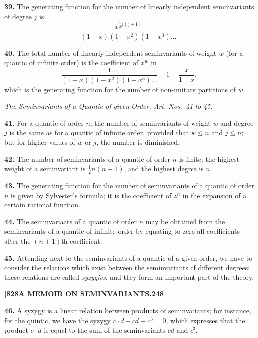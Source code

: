 \documentclass[11pt,a4paper]{book}
\begin{document}
\noindent\textbf{39.} The generating function for the number of linearly independent seminvariants of degree $j$ is
\[
\frac{x^{\frac{1}{2}j(j+1)}}{(1-x)(1-x^2)(1-x^3)\dots}.
\]

\noindent\textbf{40.} The total number of linearly independent seminvariants of weight $w$ (for a quantic of infinite order) is the coefficient of $x^w$ in
\[
\frac{1}{(1-x)(1-x^2)(1-x^3)\dots} - 1 - \frac{x}{1-x},
\]
which is the generating function for the number of non-unitary partitions of $w$.

\begin{center}
\textit{The Seminvariants of a Quantic of given Order. Art. Nos.~41 to 45.}
\end{center}

\noindent\textbf{41.} For a quantic of order $n$, the number of seminvariants of weight $w$ and degree $j$ is the same as for a quantic of infinite order, provided that $w \leq n$ and $j \leq n$; but for higher values of $w$ or $j$, the number is diminished.

\noindent\textbf{42.} The number of seminvariants of a quantic of order $n$ is finite; the highest weight of a seminvariant is $\frac{1}{2}n(n-1)$, and the highest degree is $n$.

\noindent\textbf{43.} The generating function for the number of seminvariants of a quantic of order $n$ is given by Sylvester's formula; it is the coefficient of $z^n$ in the expansion of a certain rational function.

\noindent\textbf{44.} The seminvariants of a quantic of order $n$ may be obtained from the seminvariants of a quantic of infinite order by equating to zero all coefficients after the $(n+1)$th coefficient.

\noindent\textbf{45.} Attending next to the seminvariants of a quantic of a given order, we have to consider the relations which exist between the seminvariants of different degrees; these relations are called \textit{syzygies}, and they form an important part of the theory.

\newpage
\setcounter{page}{248}

\noindent\textbf{[828}\hfill\textbf{A MEMOIR ON SEMINVARIANTS.}\hfill\textbf{248}

\bigskip

\noindent\textbf{46.} A syzygy is a linear relation between products of seminvariants; for instance, for the quintic, we have the syzygy $c \cdot d - cd - c^3 = 0$, which expresses that the product $c \cdot d$ is equal to the sum of the seminvariants $cd$ and $c^3$.
\end{document}
